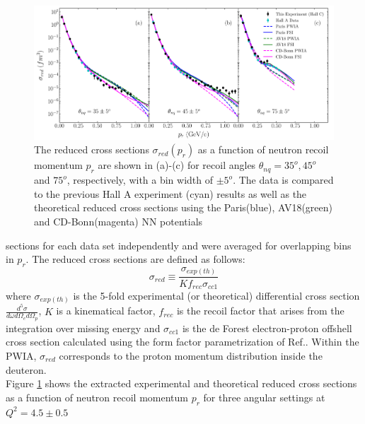 \begin{center}
\begin{figure}[hb!]
\includegraphics[scale=0.46]{../prl_plots/PRL_plot1.pdf}
\caption{The reduced cross sections $\sigma_{red}(p_{r})$ as a function of neutron recoil momentum $p_{r}$ are shown in (a)-(c) for recoil angles $\theta_{nq}=35^{o}, 45^{o}$ and $75^{o}$, respectively,
with a bin width of $\pm 5^{o}$. The data is compared to the previous Hall A experiment (cyan) results\cite{PhysRevLett.107.262501} as well as the theoretical reduced cross sections using the Paris(blue),
AV18(green) and CD-Bonn(magenta) NN potentials}
\label{fig:fig1}
\end{figure}
\end{center}
\twocolumngrid
\noindent sections for each data set independently and were averaged for overlapping bins in $p_{r}$. The reduced cross sections are defined as follows:
\begin{equation}
\sigma_{red} \equiv \frac{\sigma_{exp(th)}}{Kf_{rec}\sigma_{cc1}}
\label{eq:1}
\end{equation}
where $\sigma_{exp(th)}$ is the 5-fold experimental (or theoretical) differential cross section $\frac{d^{5}\sigma}{d\omega d\Omega_{e} d\Omega_{p}}$, $K$ is a kinematical factor, $f_{rec}$ is the recoil factor that arises from the
integration over missing energy and $\sigma_{cc1}$ is the de Forest\cite{DEFOREST1983} electron-proton offshell cross section calculated using the form factor parametrization of Ref.\cite{PhysRevC.69.022201}.
Within the PWIA, $\sigma_{red}$ corresponds to the proton momentum distribution inside the deuteron. \\
\indent Figure \ref{fig:fig1} shows the extracted experimental and theoretical reduced cross sections as a function of neutron recoil momentum $p_{r}$ for three angular settings at $Q^{2}=4.5\pm0.5$
